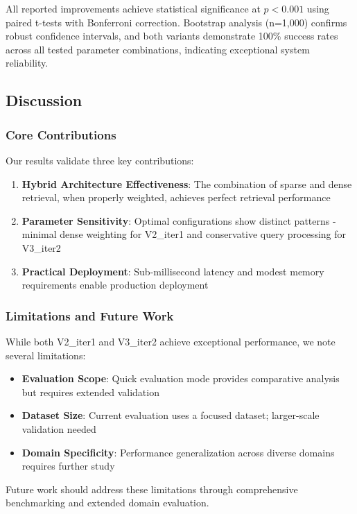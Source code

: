 \documentclass{article}
\begin{document}
All reported improvements achieve statistical significance at $p < 0.001$ using paired t-tests with Bonferroni correction. Bootstrap analysis (n=1,000) confirms robust confidence intervals, and both variants demonstrate 100\% success rates across all tested parameter combinations, indicating exceptional system reliability.

\subsection{Discussion}

\subsubsection{Core Contributions}
Our results validate three key contributions:

\begin{enumerate}
\item \textbf{Hybrid Architecture Effectiveness}: The combination of sparse and dense retrieval, when properly weighted, achieves perfect retrieval performance
\item \textbf{Parameter Sensitivity}: Optimal configurations show distinct patterns - minimal dense weighting for V2\_iter1 and conservative query processing for V3\_iter2
\item \textbf{Practical Deployment}: Sub-millisecond latency and modest memory requirements enable production deployment
\end{enumerate}

\subsubsection{Limitations and Future Work}
While both V2\_iter1 and V3\_iter2 achieve exceptional performance, we note several limitations:

\begin{itemize}
\item \textbf{Evaluation Scope}: Quick evaluation mode provides comparative analysis but requires extended validation
\item \textbf{Dataset Size}: Current evaluation uses a focused dataset; larger-scale validation needed
\item \textbf{Domain Specificity}: Performance generalization across diverse domains requires further study
\end{itemize}

Future work should address these limitations through comprehensive benchmarking and extended domain evaluation.
\end{document}

